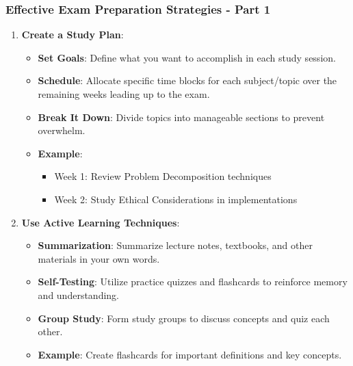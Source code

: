 \documentclass[aspectratio=169]{beamer}
\begin{document}
\begin{frame}[fragile]
    \frametitle{Effective Exam Preparation Strategies - Part 1}
    \begin{enumerate}
        \item \textbf{Create a Study Plan}:
            \begin{itemize}
                \item \textbf{Set Goals}: Define what you want to accomplish in each study session.
                \item \textbf{Schedule}: Allocate specific time blocks for each subject/topic over the remaining weeks leading up to the exam.
                \item \textbf{Break It Down}: Divide topics into manageable sections to prevent overwhelm.
                \item \textbf{Example}: 
                \begin{itemize}
                    \item Week 1: Review Problem Decomposition techniques
                    \item Week 2: Study Ethical Considerations in implementations
                \end{itemize}
            \end{itemize}
        
        \item \textbf{Use Active Learning Techniques}:
            \begin{itemize}
                \item \textbf{Summarization}: Summarize lecture notes, textbooks, and other materials in your own words.
                \item \textbf{Self-Testing}: Utilize practice quizzes and flashcards to reinforce memory and understanding.
                \item \textbf{Group Study}: Form study groups to discuss concepts and quiz each other.
                \item \textbf{Example}: Create flashcards for important definitions and key concepts.
            \end{itemize}
    \end{enumerate}
\end{frame}
\end{document}

